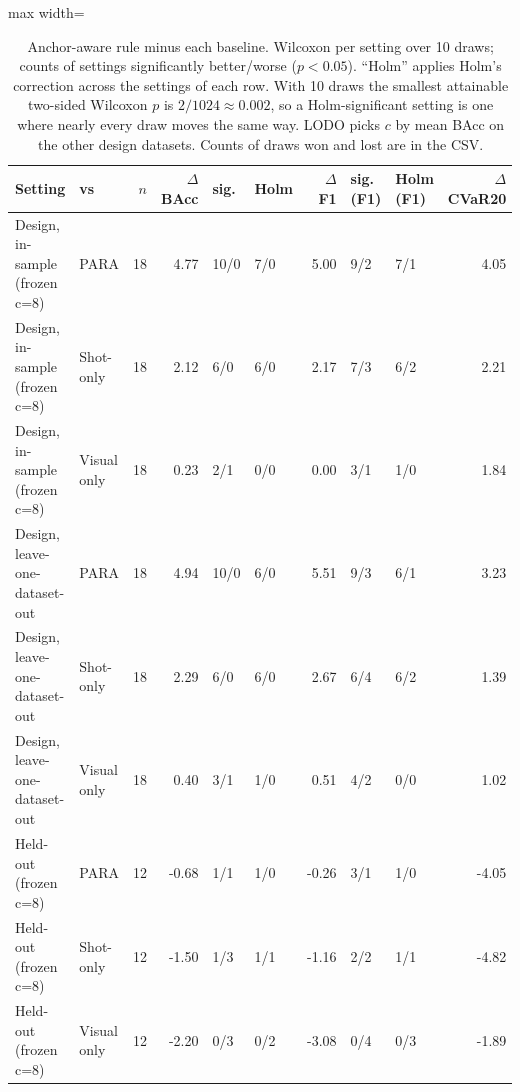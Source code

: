 \begin{table}[t]
\centering
\small
\caption{Anchor-aware rule minus each baseline. Wilcoxon per setting over 10 draws; counts of settings significantly better/worse ($p<0.05$). ``Holm'' applies Holm's correction across the settings of each row. With 10 draws the smallest attainable two-sided Wilcoxon $p$ is $2/1024 \approx 0.002$, so a Holm-significant setting is one where nearly every draw moves the same way. LODO picks $c$ by mean BAcc on the other design datasets. Counts of draws won and lost are in the CSV.}
\label{tab:T4_preregistered_rule}
\begin{adjustbox}{max width=\linewidth}
\begin{tabular}{llrrllrllr}
\toprule
Setting & vs & $n$ & $\Delta$BAcc & sig. & Holm & $\Delta$F1 & sig. (F1) & Holm (F1) & $\Delta$CVaR20 \\
\midrule
Design, in-sample (frozen c=8) & PARA & 18 & 4.77 & 10/0 & 7/0 & 5.00 & 9/2 & 7/1 & 4.05 \\
Design, in-sample (frozen c=8) & Shot-only & 18 & 2.12 & 6/0 & 6/0 & 2.17 & 7/3 & 6/2 & 2.21 \\
Design, in-sample (frozen c=8) & Visual only & 18 & 0.23 & 2/1 & 0/0 & 0.00 & 3/1 & 1/0 & 1.84 \\
Design, leave-one-dataset-out & PARA & 18 & 4.94 & 10/0 & 6/0 & 5.51 & 9/3 & 6/1 & 3.23 \\
Design, leave-one-dataset-out & Shot-only & 18 & 2.29 & 6/0 & 6/0 & 2.67 & 6/4 & 6/2 & 1.39 \\
Design, leave-one-dataset-out & Visual only & 18 & 0.40 & 3/1 & 1/0 & 0.51 & 4/2 & 0/0 & 1.02 \\
Held-out (frozen c=8) & PARA & 12 & -0.68 & 1/1 & 1/0 & -0.26 & 3/1 & 1/0 & -4.05 \\
Held-out (frozen c=8) & Shot-only & 12 & -1.50 & 1/3 & 1/1 & -1.16 & 2/2 & 1/1 & -4.82 \\
Held-out (frozen c=8) & Visual only & 12 & -2.20 & 0/3 & 0/2 & -3.08 & 0/4 & 0/3 & -1.89 \\
\bottomrule
\end{tabular}
\end{adjustbox}
\end{table}

